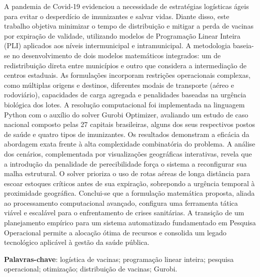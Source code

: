 \begin{resumo}
\begin{SingleSpace}
A pandemia de Covid-19 evidenciou a necessidade de estratégias logísticas ágeis para evitar o desperdício de imunizantes e salvar vidas. Diante disso, este trabalho objetiva minimizar o tempo de distribuição e mitigar a perda de vacinas por expiração de validade, utilizando modelos de Programação Linear Inteira (PLI) aplicados aos níveis intermunicipal e intramunicipal. A metodologia baseia-se no desenvolvimento de dois modelos matemáticos integrados: um de redistribuição direta entre municípios e outro que considera a intermediação de centros estaduais. As formulações incorporam restrições operacionais complexas, como múltiplas origens e destinos, diferentes modais de transporte (aéreo e rodoviário), capacidades de carga agregada e penalidades baseadas na urgência biológica dos lotes. A resolução computacional foi implementada na linguagem Python com o auxílio do solver Gurobi Optimizer, avaliando um estudo de caso nacional composto pelas 27 capitais brasileiras, alguns dos seus respectivos postos de saúde e quatro tipos de imunizantes. Os resultados demonstram a eficácia da abordagem exata frente à alta complexidade combinatória do problema. A análise dos cenários, complementada por visualizações geográficas interativas, revela que a introdução da penalidade de perecibilidade força o sistema a reconfigurar sua malha estrutural. O solver prioriza o uso de rotas aéreas de longa distância para escoar estoques críticos antes de sua expiração, sobrepondo a urgência temporal à proximidade geográfica. Conclui-se que a formulação matemática proposta, aliada ao processamento computacional avançado, configura uma ferramenta tática viável e escalável para o enfrentamento de crises sanitárias. A transição de um planejamento empírico para um sistema automatizado fundamentado em Pesquisa Operacional permite a alocação ótima de recursos e consolida um legado tecnológico aplicável à gestão da saúde pública.
\end{SingleSpace}
\vspace{\onelineskip}
\textbf{Palavras-chave}: logística de vacinas; programação linear inteira; pesquisa operacional; otimização; distribuição de vacinas; Gurobi.
\end{resumo}